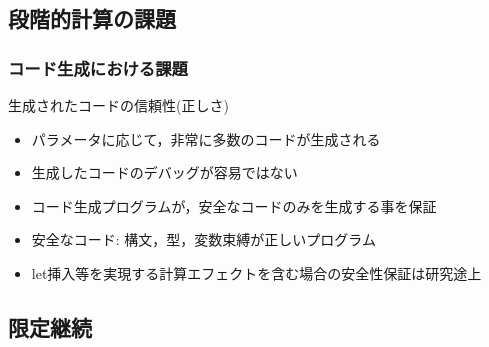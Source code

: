 \documentclass[dvipdfmx,cjk,xcolor=dvipsnames,envcountsect,notheorems,12pt]{beamer}
\theoremstyle{definition}
\begin{document}


\subsection{段階的計算の課題}

\begin{frame}
  \frametitle{コード生成における課題}
  生成されたコードの信頼性(正しさ)
  \begin{itemize}
  \item パラメータに応じて，非常に多数のコードが生成される
  \item 生成したコードのデバッグが容易ではない
  \end{itemize}

  \begin{itemize}
  \item<2-> コード生成プログラムが，安全なコードのみを生成する事を保証
  \item<2-> 安全なコード: 構文，型，変数束縛が正しいプログラム
  \item<2-> \alert{let挿入}等を実現する\alert{計算エフェクトを含む場合の安全性保証は研究途上}
  \end{itemize}
\end{frame}

\subsection{限定継続}
\end{document}

